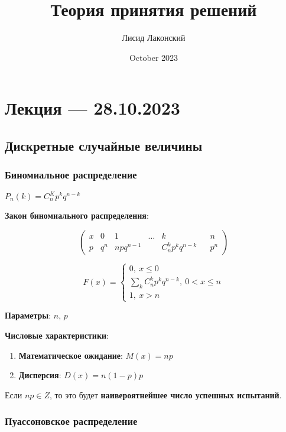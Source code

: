 \documentclass{article}
\title{Теория принятия решений}
\author{Лисид Лаконский}
\date{October 2023}
\begin{document}
\raggedright

\maketitle

\tableofcontents
\pagebreak

\section{Лекция — 28.10.2023}

\subsection{Дискретные случайные величины}

\subsubsection{Биномиальное распределение}

$P_n(k) = C_n^K p^k q^{n - k}$

\textbf{Закон биномиального распределения}:

$$
\begin{pmatrix}
  x & 0 & 1 & \dots & k & & n \\
  p & q^{n} & n p q^{n - 1} & & C_n^k p^k q^{n - k} & & p^n
\end{pmatrix}
$$

$$
F(x) = \begin{cases}
    0, \ x \le 0 \\
    \sum\limits_{k} C_{n}^{k} p^{k} q^{n - k}, \ 0 < x \le n \\
    1, \ x > n
\end{cases}
$$

\textbf{Параметры}: $n$, $p$

\textbf{Числовые характеристики}:

\begin{enumerate}
    \item \textbf{Математическое ожидание}:
    $M(x) = np$
    \item \textbf{Дисперсия}:
    $D(x) = n(1-p)p$
\end{enumerate}

Если $np \in Z$, то это будет \textbf{наивероятнейшее число успешных испытаний}.

\subsubsection{Пуассоновское распределение}
\end{document}
